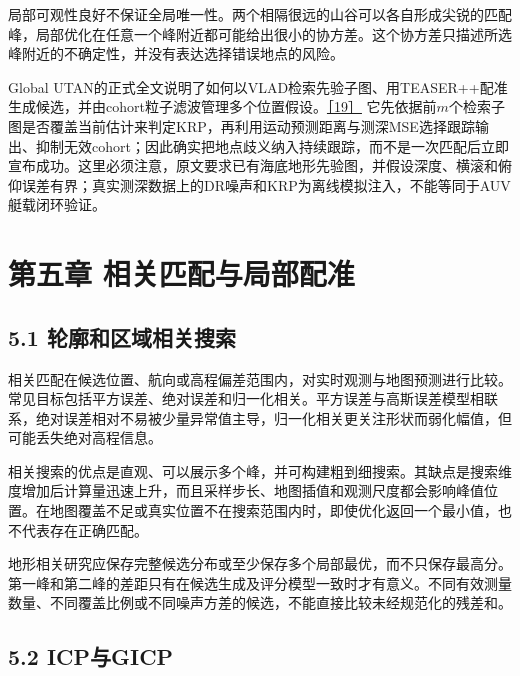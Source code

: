 局部可观性良好不保证全局唯一性。两个相隔很远的山谷可以各自形成尖锐的匹配峰，局部优化在任意一个峰附近都可能给出很小的协方差。这个协方差只描述所选峰附近的不确定性，并没有表达选择错误地点的风险。

Global UTAN的正式全文说明了如何以VLAD检索先验子图、用TEASER++配准生成候选，并由cohort粒子滤波管理多个位置假设。\href{https://doi.org/10.1109/TIM.2026.3716492}{［19］} 它先依据前\(m\)个检索子图是否覆盖当前估计来判定KRP，再利用运动预测距离与测深MSE选择跟踪输出、抑制无效cohort；因此确实把地点歧义纳入持续跟踪，而不是一次匹配后立即宣布成功。这里必须注意，原文要求已有海底地形先验图，并假设深度、横滚和俯仰误差有界；真实测深数据上的DR噪声和KRP为离线模拟注入，不能等同于AUV艇载闭环验证。

\hypertarget{ux7b2cux4e94ux7ae0-ux76f8ux5173ux5339ux914dux4e0eux5c40ux90e8ux914dux51c6}{%
\section{第五章 相关匹配与局部配准}\label{ux7b2cux4e94ux7ae0-ux76f8ux5173ux5339ux914dux4e0eux5c40ux90e8ux914dux51c6}}

\hypertarget{ux8f6eux5ed3ux548cux533aux57dfux76f8ux5173ux641cux7d22}{%
\subsection{5.1 轮廓和区域相关搜索}\label{ux8f6eux5ed3ux548cux533aux57dfux76f8ux5173ux641cux7d22}}

相关匹配在候选位置、航向或高程偏差范围内，对实时观测与地图预测进行比较。常见目标包括平方误差、绝对误差和归一化相关。平方误差与高斯误差模型相联系，绝对误差相对不易被少量异常值主导，归一化相关更关注形状而弱化幅值，但可能丢失绝对高程信息。

相关搜索的优点是直观、可以展示多个峰，并可构建粗到细搜索。其缺点是搜索维度增加后计算量迅速上升，而且采样步长、地图插值和观测尺度都会影响峰值位置。在地图覆盖不足或真实位置不在搜索范围内时，即使优化返回一个最小值，也不代表存在正确匹配。

地形相关研究应保存完整候选分布或至少保存多个局部最优，而不只保存最高分。第一峰和第二峰的差距只有在候选生成及评分模型一致时才有意义。不同有效测量数量、不同覆盖比例或不同噪声方差的候选，不能直接比较未经规范化的残差和。

\hypertarget{icpux4e0egicp}{%
\subsection{5.2 ICP与GICP}\label{icpux4e0egicp}}

